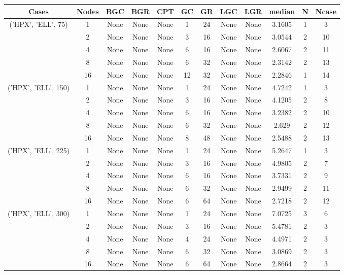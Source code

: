 \begin{tabular}{cccccccccccc}
\hline
Cases & Nodes& BGC& BGR& CPT& GC& GR& LGC& LGR& median & N & Ncase \\
\hline
\multirow{5}{*}{('HPX', 'ELL', 75)}& 1& None& None& None& 1& 24& None& None& 3.1605& 1& 3\\
& 2& None& None& None& 3& 16& None& None& 3.0544& 2& 10\\
& 4& None& None& None& 6& 16& None& None& 2.6067& 2& 11\\
& 8& None& None& None& 6& 32& None& None& 2.3142& 2& 13\\
& 16& None& None& None& 12& 32& None& None& 2.2846& 1& 14\\
\hline
\multirow{5}{*}{('HPX', 'ELL', 150)}& 1& None& None& None& 1& 24& None& None& 4.7242& 1& 3\\
& 2& None& None& None& 3& 16& None& None& 4.1205& 2& 8\\
& 4& None& None& None& 6& 16& None& None& 3.2382& 2& 10\\
& 8& None& None& None& 6& 32& None& None& 2.629& 2& 12\\
& 16& None& None& None& 8& 48& None& None& 2.5488& 2& 13\\
\hline
\multirow{5}{*}{('HPX', 'ELL', 225)}& 1& None& None& None& 1& 24& None& None& 5.2647& 1& 3\\
& 2& None& None& None& 3& 16& None& None& 4.9805& 2& 7\\
& 4& None& None& None& 6& 16& None& None& 3.7331& 2& 9\\
& 8& None& None& None& 6& 32& None& None& 2.9499& 2& 11\\
& 16& None& None& None& 6& 64& None& None& 2.7218& 2& 12\\
\hline
\multirow{5}{*}{('HPX', 'ELL', 300)}& 1& None& None& None& 1& 24& None& None& 7.0725& 3& 6\\
& 2& None& None& None& 3& 16& None& None& 5.4781& 2& 3\\
& 4& None& None& None& 4& 24& None& None& 4.4971& 2& 3\\
& 8& None& None& None& 6& 32& None& None& 3.0869& 2& 3\\
& 16& None& None& None& 6& 64& None& None& 2.8664& 2& 3\\
\hline
\end{tabular}
